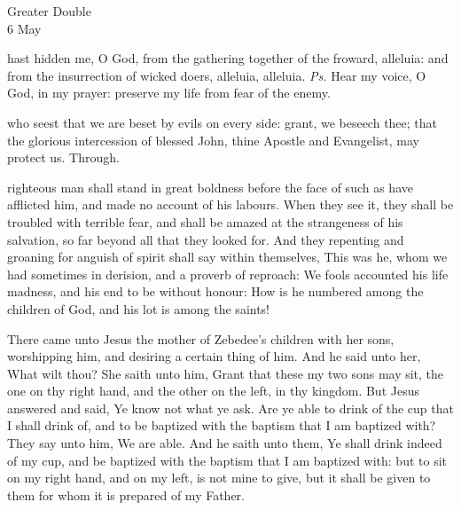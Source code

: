 \begin{inhead}
    {Greater Double\\
6 May}
\end{inhead}

\introit
{} hast hidden me, O God, from the gathering together of the froward, alleluia: and from the insurrection of wicked doers, alleluia, alleluia. \textit{Ps.} Hear my voice, O God, in my prayer: preserve my life from fear of the enemy.

\collect
{} who seest that we are beset by evils on every side: grant, we beseech thee; that the glorious intercession of blessed John, thine Apostle and Evangelist, may protect us. Through.

 righteous man shall stand in great boldness before the face of such as have afflicted him, and made no account of his labours. When they see it, they shall be troubled with terrible fear, and shall be amazed at the strangeness of his salvation, so far beyond all that they looked for. And they repenting and groaning for anguish of spirit shall say within themselves, This was he, whom we had sometimes in derision, and a proverb of reproach: We fools accounted his life madness, and his end to be without honour: How is he numbered among the children of God, and his lot is among the saints!


 There came unto Jesus the mother of Zebedee's children with her sons, worshipping him, and desiring a certain thing of him. And he said unto her, What wilt thou? She saith unto him, Grant that these my two sons may sit, the one on thy right hand, and the other on the left, in thy kingdom. But Jesus answered and said, Ye know not what ye ask. Are ye able to drink of the cup that I shall drink of, and to be baptized with the baptism that I am baptized with? They say unto him, We are able. And he saith unto them, Ye shall drink indeed of my cup, and be baptized with the baptism that I am baptized with: but to sit on my right hand, and on my left, is not mine to give, but it shall be given to them for whom it is prepared of my Father.

